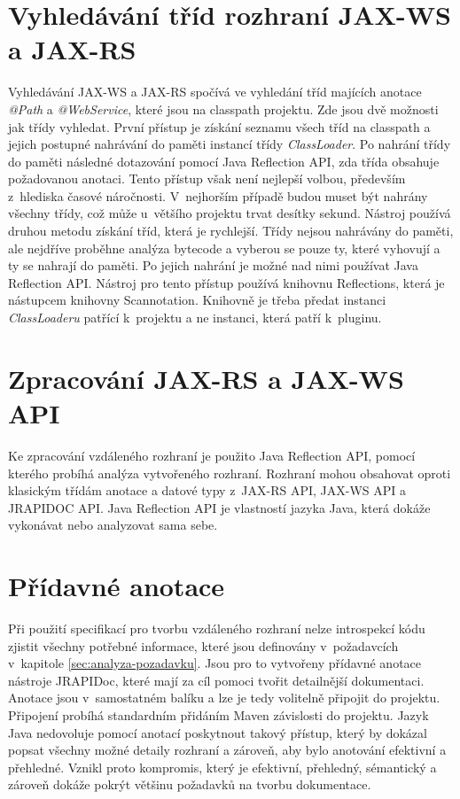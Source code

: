 \documentclass[11pt,twoside,a4paper]{book}
\begin{document}
\section{Vyhledávání tříd rozhraní JAX-WS a JAX-RS}

Vyhledávání JAX-WS a JAX-RS spočívá ve vyhledání tříd majících anotace {\em
@Path} a {\em @WebService}, které jsou na classpath projektu. Zde jsou dvě
možnosti jak třídy vyhledat.
První přístup je získání seznamu všech tříd na classpath a jejich postupné
nahrávání do paměti instancí třídy {\em ClassLoader}. Po nahrání třídy do paměti
následné dotazování pomocí Java Reflection API, zda třída obsahuje požadovanou
anotaci. Tento přístup však není nejlepší volbou, především z~hlediska časové
náročnosti. V~nejhorším případě budou muset být nahrány všechny třídy, což může
u~většího projektu trvat desítky sekund. Nástroj používá druhou metodu získání
tříd, která je rychlejší. Třídy nejsou nahrávány do paměti, ale nejdříve
proběhne analýza bytecode a vyberou se pouze ty, které vyhovují a ty se nahrají do
paměti.
Po jejich nahrání je možné nad nimi používat Java Reflection API. Nástroj pro
tento přístup používá knihovnu Reflections, která je nástupcem knihovny
Scannotation. Knihovně je třeba předat instanci {\em ClassLoaderu} patřící
k~projektu a ne instanci, která patří k~pluginu.

\section{Zpracování JAX-RS a JAX-WS API}

Ke zpracování vzdáleného rozhraní je použito Java Reflection API, pomocí kterého probíhá
analýza vytvořeného rozhraní. Rozhraní mohou obsahovat oproti klasickým třídám anotace a
datové typy z~JAX-RS API, JAX-WS API a JRAPIDOC API. Java Reflection API je
vlastností jazyka Java, která dokáže vykonávat nebo analyzovat sama sebe.

\section{Přídavné anotace}

Při použití specifikací pro tvorbu vzdáleného rozhraní nelze introspekcí kódu
zjistit všechny potřebné informace, které jsou definovány v~požadavcích
v~kapitole \ref{sec:analyza-pozadavku}.
Jsou pro to vytvořeny přídavné anotace nástroje JRAPIDoc, které mají za cíl
pomoci tvořit detailnější dokumentaci. Anotace jsou v~samostatném balíku a lze
je tedy volitelně připojit do projektu. Připojení probíhá standardním přidáním
Maven závislosti do projektu. Jazyk Java nedovoluje pomocí anotací poskytnout
takový přístup, který by dokázal popsat všechny možné detaily rozhraní a
zároveň, aby bylo anotování efektivní a přehledné. Vznikl proto kompromis, který
je efektivní, přehledný, sémantický a zároveň dokáže pokrýt většinu požadavků na
tvorbu dokumentace.
\end{document}
